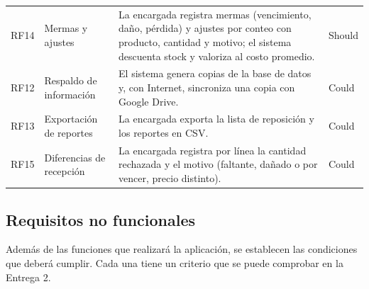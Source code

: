 \documentclass[10pt,a4paper]{article}
\begin{document}
\begin{longtable}{@{}p{0.9cm}p{3.2cm}p{9.6cm}p{1.3cm}@{}}
RF14 & Mermas y ajustes & La encargada registra mermas (vencimiento, daño, pérdida) y ajustes por conteo con producto, cantidad y motivo; el sistema descuenta stock y valoriza al costo promedio. & Should \\
RF12 & Respaldo de información & El sistema genera copias de la base de datos y, con Internet, sincroniza una copia con Google Drive. & Could \\
RF13 & Exportación de reportes & La encargada exporta la lista de reposición y los reportes en CSV. & Could \\
RF15 & Diferencias de recepción & La encargada registra por línea la cantidad rechazada y el motivo (faltante, dañado o por vencer, precio distinto). & Could \\
\bottomrule
\end{longtable}
\normalsize

\subsection{Requisitos no funcionales}

Además de las funciones que realizará la aplicación, se establecen las condiciones que deberá cumplir. Cada una tiene un criterio que se puede comprobar en la Entrega 2.
\end{document}
